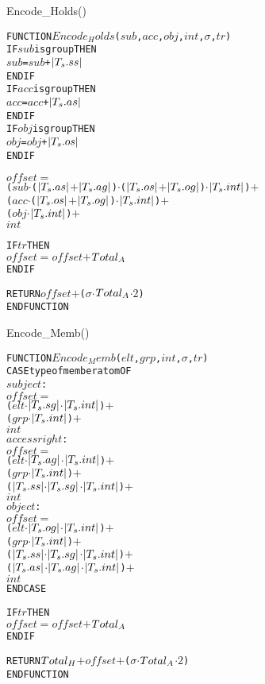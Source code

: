 \documentclass[11pt]{report}
\newenvironment{vverbatim}
{
  \begin{alltt}
}
{
    \vspace{-\baselineskip}
  \end{alltt}
}
\newlength{\valgorithmboxwidth}
\newenvironment{valgorithm}[3][tbhp]
{
  \setlength{\valgorithmboxwidth}{\linewidth-2em}

  \begin{valgorithmfloat}[#1]
    \caption{#2}
    \label{#3}
    \hspace{1em}
    \begin{lrbox}{\valgorithmbox}
      \begin{minipage}[l]{\valgorithmboxwidth}
        \small
        \begin{vverbatim}
}
{
        \end{vverbatim}
      \end{minipage}
    \end{lrbox}
    \framebox[\valgorithmboxwidth][l]{\usebox{\valgorithmbox}}
  \end{valgorithmfloat}
}
\begin{document}
        \begin{valgorithm}[tbhp]{Encode\_Holds()}{algo-encode-holds}
FUNCTION \(Encode_Holds\)(\(sub\), \(acc\), \(obj\), \(int\), \(\sigma\), \(tr\))
  IF \(sub\) is group THEN
    \(sub\) = \(sub\) + \(|T\sb{s}.ss|\)
  ENDIF
  IF \(acc\) is group THEN
    \(acc\) = \(acc\) + \(|T\sb{s}.as|\)
  ENDIF
  IF \(obj\) is group THEN
    \(obj\) = \(obj\) + \(|T\sb{s}.os|\)
  ENDIF

  \(offset\) \(=\)
    (\(sub\) \(\cdot\) (\(|T\sb{s}.as|\) \(+\) \(|T\sb{s}.ag|\)) \(\cdot\) (\(|T\sb{s}.os|\) \(+\) \(|T\sb{s}.og|\)) \(\cdot\) \(|T\sb{s}.int|\)) \(+\)
    (\(acc\) \(\cdot\) (\(|T\sb{s}.os|\) \(+\) \(|T\sb{s}.og|\)) \(\cdot\) \(|T\sb{s}.int|\)) \(+\)
    (\(obj\) \(\cdot\) \(|T\sb{s}.int|\)) \(+\)
    \(int\)
    
  IF \(tr\) THEN
    \(offset\) \(=\) \(offset\) \(+\) \(Total\sb{A}\)
  ENDIF

  RETURN \(offset\) \(+\) (\(\sigma\) \(\cdot\) \(Total\sb{A}\) \(\cdot\) \(2\))
ENDFUNCTION
        \end{valgorithm}

        \begin{valgorithm}[tbhp]{Encode\_Memb()}{algo-encode-memb}
FUNCTION \(Encode_Memb\)(\(elt\), \(grp\), \(int\), \(\sigma\), \(tr\))
  CASE type of member atom OF
    \(subject\) :
      \(offset\) \(=\)
        (\(elt\) \(\cdot\) \(|T\sb{s}.sg|\) \(\cdot\) \(|T\sb{s}.int|\)) \(+\)
        (\(grp\) \(\cdot\) \(|T\sb{s}.int|\)) \(+\)
        \(int\)
    \(access right\) :
      \(offset\) \(=\)
        (\(elt\) \(\cdot\) \(|T\sb{s}.ag|\) \(\cdot\) \(|T\sb{s}.int|\)) \(+\)
        (\(grp\) \(\cdot\) \(|T\sb{s}.int|\)) \(+\)
        (\(|T\sb{s}.ss|\) \(\cdot\) \(|T\sb{s}.sg|\) \(\cdot\) \(|T\sb{s}.int|\)) \(+\)
        \(int\)
    \(object\) :
      \(offset\) \(=\)
        (\(elt\) \(\cdot\) \(|T\sb{s}.og|\) \(\cdot\) \(|T\sb{s}.int|\)) \(+\)
        (\(grp\) \(\cdot\) \(|T\sb{s}.int|\)) \(+\)
        (\(|T\sb{s}.ss|\) \(\cdot\) \(|T\sb{s}.sg|\) \(\cdot\) \(|T\sb{s}.int|\)) \(+\)
        (\(|T\sb{s}.as|\) \(\cdot\) \(|T\sb{s}.ag|\) \(\cdot\) \(|T\sb{s}.int|\)) \(+\)
        \(int\)
  ENDCASE
    
  IF \(tr\) THEN
    \(offset\) \(=\) \(offset\) \(+\) \(Total\sb{A}\)
  ENDIF

  RETURN \(Total\sb{H}\) \(+\) \(offset\) \(+\) (\(\sigma\) \(\cdot\) \(Total\sb{A}\) \(\cdot\) \(2\))
ENDFUNCTION
        \end{valgorithm}
\end{document}
